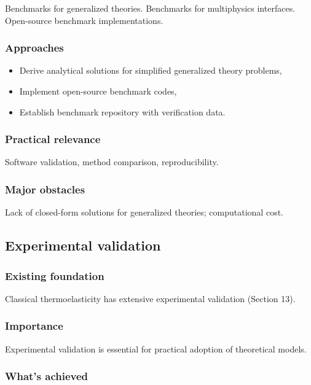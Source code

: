 Benchmarks for generalized theories. Benchmarks for multiphysics interfaces. Open-source benchmark implementations.

\subsubsection{Approaches}

\begin{itemize}
\item Derive analytical solutions for simplified generalized theory problems,
\item Implement open-source benchmark codes,
\item Establish benchmark repository with verification data.
\end{itemize}

\subsubsection{Practical relevance}

Software validation, method comparison, reproducibility.

\subsubsection{Major obstacles}

Lack of closed-form solutions for generalized theories; computational cost.

\subsection{Experimental validation}
\label{sec:16.8}

\subsubsection{Existing foundation}

Classical thermoelasticity has extensive experimental validation (Section 13).

\subsubsection{Importance}

Experimental validation is essential for practical adoption of theoretical models.

\subsubsection{What's achieved}

